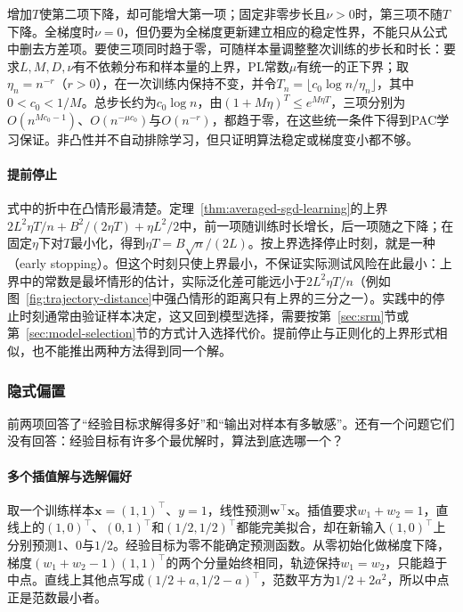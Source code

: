 增加$T$使第二项下降，却可能增大第一项；固定非零步长且$\nu>0$时，第三项不随$T$下降。全梯度时$\nu=0$，但仍要为全梯度更新建立相应的稳定性界，不能只从公式中删去方差项。要使三项同时趋于零，可随样本量调整整次训练的步长和时长：要求$L,M,D,\nu$有不依赖分布和样本量的上界，PL常数$\mu$有统一的正下界；取$\eta_n=n^{-r}$（$r>0$），在一次训练内保持不变，并令$T_n=\lfloor c_0\log n/\eta_n\rfloor$，其中$0<c_0<1/M$。总步长约为$c_0\log n$，由$(1+M\eta)^T\leq e^{M\eta T}$，三项分别为$O(n^{Mc_0-1})$、$O(n^{-\mu c_0})$与$O(n^{-r})$，都趋于零，在这些统一条件下得到PAC学习保证。非凸性并不自动排除学习，但只证明算法稳定或梯度变小都不够。

\paragraph{提前停止}

式中的折中在凸情形最清楚。定理~\ref{thm:averaged-sgd-learning}的上界$2L^2\eta T/n+B^2/(2\eta T)+\eta L^2/2$中，前一项随训练时长增长，后一项随之下降；在固定$\eta$下对$T$最小化，得到$\eta T=B\sqrt n/(2L)$。按上界选择停止时刻，就是一种（early stopping）。但这个时刻只使上界最小，不保证实际测试风险在此最小：上界中的常数是最坏情形的估计，实际泛化差可能远小于$2L^2\eta T/n$（例如图~\ref{fig:trajectory-distance}中强凸情形的距离只有上界的三分之一）。实践中的停止时刻通常由验证样本决定，这又回到模型选择，需要按第~\ref{sec:srm}节或第~\ref{sec:model-selection}节的方式计入选择代价。提前停止与正则化的上界形式相似，也不能推出两种方法得到同一个解。

\subsubsection{隐式偏置}
\label{sec:linear-implicit-bias}
\label{sec:implicit-bias-linear}

前两项回答了“经验目标求解得多好”和“输出对样本有多敏感”。还有一个问题它们没有回答：经验目标有许多个最优解时，算法到底选哪一个？

\paragraph{多个插值解与选解偏好}

取一个训练样本$\bm x=(1,1)^\top$、$y=1$，线性预测$\bm w^\top\bm x$。插值要求$w_1+w_2=1$，直线上的$(1,0)^\top$、$(0,1)^\top$和$(1/2,1/2)^\top$都能完美拟合，却在新输入$(1,0)^\top$上分别预测1、0与$1/2$。经验目标为零不能确定预测函数。从零初始化做梯度下降，梯度$(w_1+w_2-1)(1,1)^\top$的两个分量始终相同，轨迹保持$w_1=w_2$，只能趋于中点。直线上其他点写成$(1/2+a,1/2-a)^\top$，范数平方为$1/2+2a^2$，所以中点正是范数最小者。

